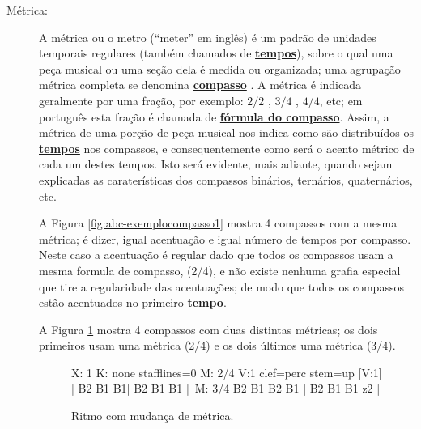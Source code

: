 \begin{description}
\item[Métrica:] \label{def:Metrica} 
A métrica ou o metro  (``meter'' em inglês) é
um padrão de unidades temporais regulares (também chamados de \hyperref[sec:Tempo]{\textbf{tempos}}), 
sobre o qual uma peça musical ou uma seção dela é medida ou organizada;
uma agrupação métrica completa se denomina \hyperref[def:Compasso]{\textbf{compasso}} \cite[pp. 947]{latham2008diccionario} \cite[pp. 523]{apel1969harvard}.
A métrica é indicada geralmente por uma fração, por exemplo:
${2}/{2}$ , ${3}/{4}$ , ${4}/{4}$, etc; 
em português esta fração é chamada de \hyperref[def:FormulaCompasso]{\textbf{fórmula do compasso}}.
Assim, a métrica de uma porção de peça musical nos indica como são distribuídos os 
\hyperref[sec:Tempo]{\textbf{tempos}} nos compassos,
e consequentemente como será o acento métrico de cada um destes tempos. 
Isto será evidente, mais adiante, 
quando sejam explicadas as caraterísticas dos compassos binários, ternários, quaternários, etc.
\begin{example}
A Figura \ref{fig:abc-exemplocompasso1} mostra 4 compassos com a mesma métrica;
é dizer, igual acentuação e igual número de tempos por compasso.
Neste caso a acentuação é regular dado que todos os compassos usam a mesma formula de compasso, (2/4), 
e não existe nenhuma grafia especial que tire a regularidade das acentuações;
de modo que todos os compassos estão acentuados no primeiro \hyperref[sec:Tempo]{\textbf{tempo}}.
\end{example}

\begin{example}
A Figura \ref{fig:abc-exemplometrica1} mostra 4 compassos com duas distintas métricas;
os dois primeiros usam uma métrica (2/4) e os dois últimos uma métrica (3/4).
\end{example}

\begin{figure}[h]
\centering
\begin{abc}[name=abc-exemplometrica1]
%
X: 1 %
K: none stafflines=0 %
M: 2/4
V:1 clef=perc stem=up %
%
[V:1] | B2 B1 B1| B2 B1 B1 |\
M: 3/4 
B2 B1 B2 B1 | B2 B1 B1 z2  |
%       
\end{abc}
\caption{Ritmo com mudança de métrica.}
\label{fig:abc-exemplometrica1}
\end{figure}


\end{description}
